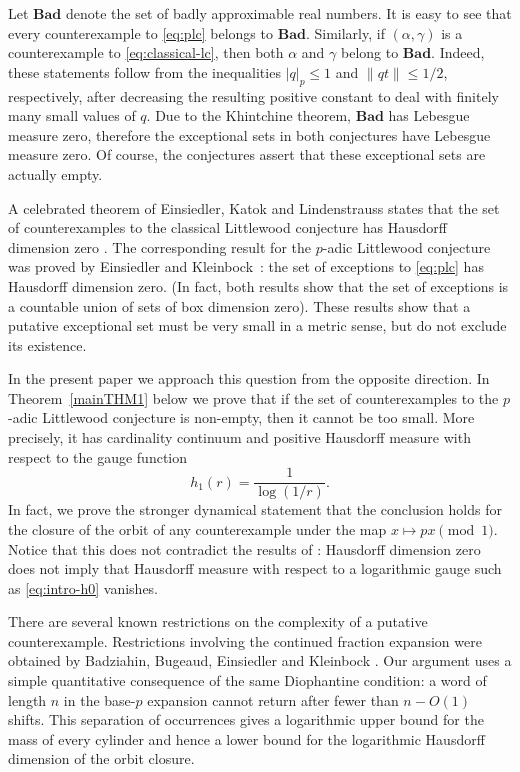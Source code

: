 \documentclass[11pt]{article}
\theoremstyle{remark}
\newcommand{\bad}{\mathbf{Bad}}
\begin{document}
Let $\bad$ denote the set of badly approximable real
numbers. It is easy to see that every counterexample to
\eqref{eq:plc} belongs to $\bad$.  Similarly, if $(\alpha,\gamma)$
is a counterexample to \eqref{eq:classical-lc}, then both $\alpha$
and $\gamma$ belong to $\bad$. Indeed, these statements follow from
the inequalities $|q|_p\leq1$ and $\|qt\|\leq1/2$, respectively,
after decreasing the resulting positive constant to deal with
finitely many small values of $q$. Due to the Khintchine theorem,
$\bad$ has Lebesgue measure zero, therefore the exceptional sets in
both conjectures have Lebesgue measure zero.  Of course, the
conjectures assert that these exceptional sets are actually empty.

A celebrated theorem of Einsiedler, Katok and Lindenstrauss states
that the set of counterexamples to the classical Littlewood
conjecture has Hausdorff dimension zero
\cite{EinsiedlerKatokLindenstrauss2006}.  The corresponding result
for the $p$-adic Littlewood conjecture was proved by Einsiedler and
Kleinbock~\cite{EinsiedlerKleinbock2007}: the set of exceptions to
\eqref{eq:plc} has Hausdorff dimension zero. (In fact, both results
show that the set of exceptions is a countable union of sets of box
dimension zero).  These results show that a putative exceptional set
must be very small in a metric sense, but do not exclude its
existence.

In the present paper we approach this question from the opposite
direction. In Theorem~\ref{mainTHM1} below we prove that if the set
of counterexamples to the $p$-adic Littlewood conjecture is
non-empty, then it cannot be too small.  More precisely, it has
cardinality continuum and positive Hausdorff measure with respect to
the gauge function
\begin{equation} \label{eq:intro-h0}
    h_1(r)=\frac{1}{\log(1/r)}.
\end{equation}
In fact, we prove the stronger dynamical statement that the
conclusion holds for the closure of the orbit of any counterexample
under the map $x\mapsto px\pmod 1$.  Notice that this does not
contradict the results of
\cite{EinsiedlerKleinbock2007,EinsiedlerKatokLindenstrauss2006}:
Hausdorff dimension zero does not imply that Hausdorff measure with
respect to a logarithmic gauge such as \eqref{eq:intro-h0} vanishes.

There are several known restrictions on the complexity of a putative
counterexample.  Restrictions involving the continued fraction
expansion were obtained by Badziahin, Bugeaud, Einsiedler and
Kleinbock \cite{BadziahinBugeaudEinsiedlerKleinbock2015}. Our
argument uses a simple quantitative consequence of the same
Diophantine condition: a word of length $n$ in the base-$p$
expansion cannot return after fewer than $n-O(1)$ shifts. This
separation of occurrences gives a logarithmic upper bound for the
mass of every cylinder and hence a lower bound for the logarithmic
Hausdorff dimension of the orbit closure.
\end{document}
